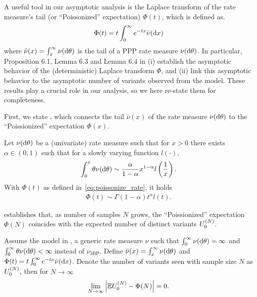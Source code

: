 A useful tool in our asymptotic analysis is the Laplace transform of the rate measure's tail (or ``Poissonized'' expectation) $\Phi(t)$, which is defined as. 
\begin{equation}
    \label{eq:poissonize_rate}
    \Phi(t)=t\int_0^\infty e^{-tx}\bar{\nu}(\mathrm{d} x)
\end{equation}
where $\bar{\nu}(x)=\int_x^\infty \nu(\mathrm{d}\theta)$ is the tail of a PPP rate measure $\nu(\mathrm{d}\theta)$. In particular, Proposition 6.1, Lemma 6.3 and Lemma 6.4 in \citet{Broderick2012} 
(i) establish the asymptotic behavior of the (deterministic) Laplace transform $\Phi$, and 
(ii) link this asymptotic behavior to the asymptotic number of variants observed from the model. 
These results play a crucial role in our analysis, so we here re-state them for completeness.

First, we state , which connects the tail $\bar{\nu}(x)$ of the rate measure $\nu(\mathrm{d}\theta)$ to the ``Poissionized'' expectation $\Phi(x)$.
\begin{myLemma}
    \label{lemma:broderick12_6.1}
    Let $\nu(\mathrm{d} \theta)$ be a (univariate) rate measure such that for $x>0$ there exists $\alpha\in (0,1)$ such that for a slowly varying function $l(\cdot)$,
        	\begin{equation}
            \label{eq:integral_req}
            \int_0^x \theta \nu(\mathrm{d}\theta)\sim \frac{\alpha}{1-\alpha} x^{1-\alpha}l\left(\frac{1}{x}\right).
        \end{equation}
        With $\Phi(t)$ as defined in~\cref{eq:poissonize_rate}, it holds %
    \begin{align*}
        \Phi(t) \sim \Gamma(1-\alpha)t^\alpha l(t).
    \end{align*}
\end{myLemma}

 establishes that,  as number of samples $N$ grows, the ``Poissionized'' expectation $\Phi(N)$ coincides with the expected number of distinct variants $U_{ 0}^{(N)}$.
\begin{myLemma}
    \label{lemma:broderick12_6.3}
    Assume the model in ,  a generic rate measure $\nu$ such that $\int_0^\infty \nu(\mathrm{d}\theta)=\infty$ and $\int_0^\infty \theta \nu(\mathrm{d}\theta)<\infty$ instead of $\nu_{\mathrm{3BP}}$. Define $\bar{\nu}(x)=\int_x^\infty \nu(\mathrm{d}\theta)$ and $\Phi(t)=t\int_0^\infty e^{-tx}\bar{\nu}(\mathrm{d} x)$. Denote the number of variants seen with sample size $N$ as $U_{ 0}^{(N)}$, then for $N\to\infty$
    \begin{align*}
       \lim_{N\to \infty} \left|\mathbb{E} U_{ 0}^{(N)}- \Phi(N) \right| = 0.
    \end{align*}
\end{myLemma}

